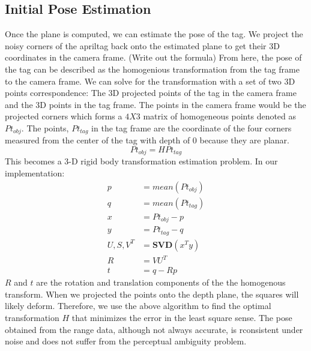 \subsection{Initial Pose Estimation}
Once the plane is computed, we can estimate the pose of the tag. We project the noisy corners of the apriltag back onto the estimated plane to get their 3D coordinates in the camera frame. (Write out the formula) From here, the pose of the tag can be described as the homogenious transformation from the tag frame to the camera frame. We can solve for the transformation with a set of two 3D points correspondence: The 3D projected points of the tag in the camera frame and the 3D points in the tag frame. The points in the camera frame would be the projected corners which forms a $4X3$ matrix of homogeneous points denoted as $Pt_{obj}$. The points, $Pt_{tag}$ in the tag frame are the coordinate of the four corners measured from the center of the tag with depth of 0 because they are planar. 
$$Pt_{obj} = H Pt_{tag}$$
This becomes a 3-D rigid body transformation estimation problem. In our implementation:
\begin{align*}
p &= mean(Pt_{obj})\\
q &= mean(Pt_{tag})\\
x &=Pt_{obj} - p\\
y &=Pt_{tag} - q\\
U, S, V^T &= \textbf{SVD}(x^T y)\\
R &= VU^T \\
t &= q-Rp 
\end{align*}
$R$ and $t$ are the rotation and translation components of the the homogenous transform. When we projected the points onto the depth plane, the squares will likely deform. Therefore, we use the above algorithm to find the optimal transformation $H$ that minimizes the error in the least square sense. 
The pose obtained from the range data, although not always accurate, is rconsistent under noise and does not suffer from the perceptual ambiguity problem. 
